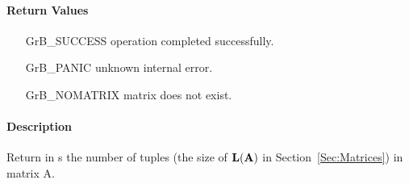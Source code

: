 \paragraph{Return Values}

\begin{itemize}[leftmargin=2.1in]
\item[{\sf GrB\_SUCCESS}]   operation completed successfully.
\item[{\sf GrB\_PANIC}]     unknown internal error.
\item[{\sf GrB\_NOMATRIX}]  matrix does not exist.
\end{itemize}

\paragraph{Description}

Return in {\sf s} the number of tuples (the size of $\bold{L}({\bf A})$
in Section~\ref{Sec:Matrices}) in matrix {\sf A}.
